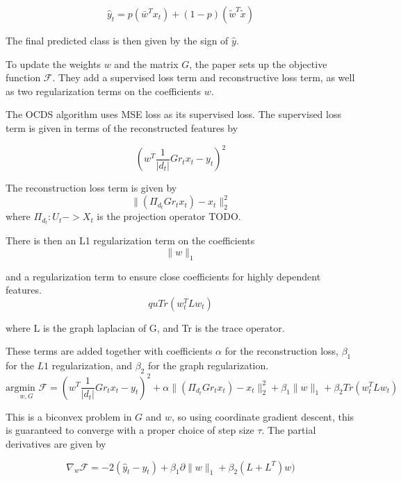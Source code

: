 \begin{equation}
  \hat y_t = p (\bar w^T x_t) + (1-p) (\tilde w^T \tilde x)
\end{equation}

The final predicted class is then given by the sign of $\hat y$.

To update the weights $w$ and the matrix $G$, the paper sets up the objective
function $\mathcal F$. They add a supervised loss term and reconstructive loss
term, as well as two regularization terms on the coefficients $w$. 

The OCDS algorithm uses MSE loss as its supervised loss. The supervised loss
term is given in terms of the reconstructed features by 

\begin{equation}
  (w^T \frac {1}{|d_t|} Gr_t x_t - y_t)^2
\end{equation}

The reconstruction loss term is given by 
\begin{equation}
  \|(\Pi_{d_t} Gr_t x_t) - x_t\|^2_2
\end{equation}
where $\Pi_{d_t} : U_t -> X_t$ is the projection operator TODO.

There is then an L1 regularization term on the coefficients
\begin{equation}
  \|w\|_1
\end{equation}

and a regularization term to ensure close coefficients for highly dependent
features.
\begin{equation}
  quTr(w_t^T L w_t)
\end{equation}

where L is the graph laplacian of G, and Tr is the trace operator.

These terms are added together with coefficients $\alpha$ for the
reconstruction loss, $\beta_1$ for the $L1$ regularization, and $\beta_2$ for
the graph regularization.
\begin{equation}
  \underset{w,G}{\text{argmin} \,\, \mathcal F} = (w^T \frac {1}{|d_t|} Gr_t x_t -
  y_t)^2 + \alpha \|(\Pi_{d_t} Gr_t x_t) - x_t\|^2_2 + \beta_1 \|w\|_1 +
  \beta_2 Tr(w_t^T L w_t)
\end{equation}

This is a biconvex problem in $G$ and $w$, so using coordinate gradient
descent, this is guaranteed to converge with a proper choice of step size
$\tau$.  The partial derivatives are given by

\begin{equation}
  \nabla_w \mathcal F = -2(\hat y_t - y_t) + \beta_1 \partial \|w\|_1 +
\beta_2(L + L^T)w) 
\end{equation}

